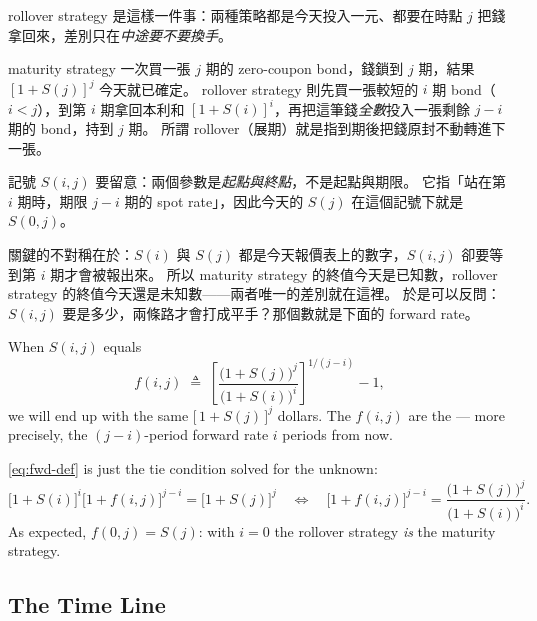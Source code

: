 \begin{remark}
	rollover strategy 是這樣一件事：兩種策略都是今天投入一元、都要在時點 $j$ 把錢拿回來，差別只在\emph{中途要不要換手}。

	maturity strategy 一次買一張 $j$ 期的 zero-coupon bond，錢鎖到 $j$ 期，結果 $[1+S(j)]^{j}$ 今天就已確定。
	rollover strategy 則先買一張較短的 $i$ 期 bond（$i<j$），到第 $i$ 期拿回本利和 $[1+S(i)]^{i}$，再把這筆錢\emph{全數}投入一張剩餘 $j-i$ 期的 bond，持到 $j$ 期。
	所謂 rollover（展期）就是指到期後把錢原封不動轉進下一張。

	記號 $S(i,j)$ 要留意：兩個參數是\emph{起點與終點}，不是起點與期限。
	它指「站在第 $i$ 期時，期限 $j-i$ 期的 spot rate」，因此今天的 $S(j)$ 在這個記號下就是 $S(0,j)$。

	關鍵的不對稱在於：$S(i)$ 與 $S(j)$ 都是今天報價表上的數字，$S(i,j)$ 卻要等到第 $i$ 期才會被報出來。
	所以 maturity strategy 的終值今天是已知數，rollover strategy 的終值今天還是未知數——兩者唯一的差別就在這裡。
	於是可以反問：$S(i,j)$ 要是多少，兩條路才會打成平手？那個數就是下面的 forward rate。
\end{remark}
\suppend


\begin{definition}
	When $S(i,j)$ equals
	\begin{equation}
		f(i,j) \;\triangleq\; \left[\frac{\bigl(1+S(j)\bigr)^{j}}{\bigl(1+S(i)\bigr)^{i}}\right]^{1/(j-i)} - 1 , \label{eq:fwd-def}
	\end{equation}
	we will end up with the same $\bigl[\,1+S(j)\,\bigr]^{j}$ dollars.
	The $f(i,j)$ are the  --- more precisely, the $(j-i)$-period forward rate $i$ periods from now.
\end{definition}

\suppstart
\eqref{eq:fwd-def} is just the tie condition solved for the unknown:
\[
	\bigl[1+S(i)\bigr]^{i}\bigl[1+f(i,j)\bigr]^{j-i} = \bigl[1+S(j)\bigr]^{j}
	\quad\Longleftrightarrow\quad
	\bigl[1+f(i,j)\bigr]^{j-i} = \frac{\bigl(1+S(j)\bigr)^{j}}{\bigl(1+S(i)\bigr)^{i}} .
\]
\suppend
As expected, $f(0,j)=S(j)$: with $i=0$ the rollover strategy \emph{is} the maturity strategy.

\subsection{The Time Line}


